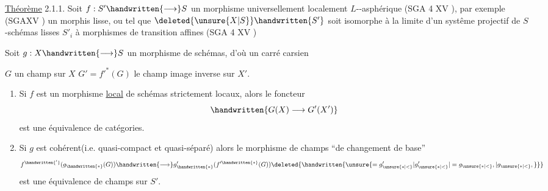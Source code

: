 \reversemarginpar
{}
\normalmarginpar
\uline{Théorème} 2.1.1. Soit $f:S'\handwritten{\longrightarrow}S$ un morphisme universellement localement \uline{$L$}--asphérique (SGA 4 XV ), par exemple (SGAXV ) un morphis lisse, ou tel que $\deleted{\unsure{X|S}}\handwritten{S'}$ soit isomorphe à la limite  d'un systême projectif  de $S$-schémas lisses $S'_i$ à morphismes de transition affines\deleted{\unsure{,}} (SGA 4 XV )

Soit $g:X\handwritten{\longrightarrow}S$ un morphisme de schémas, d'où un carré carsien

$G$ un  champ sur $X$   $G'=f'^*(G)$ le champ image inverse sur $X'$.

\begin{enumerate}[label=\alph*)]
\item Si  $f$ est un morphisme  \uline{local} de schémas strictement locaux, alors le foncteur
\[
\handwritten{G(X)\longrightarrow G'(X')}
\]
est une équivalence de catégories.

\item Si $g$ est cohérent(i.e. quasi-compact et quasi-séparé) alors le morphisme de champs ``de changement de base''
\[
f^{\handwritten{'}}(g_{\handwritten{*}}(G))\handwritten{\longrightarrow}g'_{\handwritten{*}}(f'^{\handwritten{*}}(G))\deleted{\handwritten{\unsure{=g_{\unsure{*|<}}'|g_{\unsure{*|<}}'|=g_{\unsure{*|<}},|g_{\unsure{*|<}},}}}
\]
est une équivalence de champs sur $S'$.
\end{enumerate}


